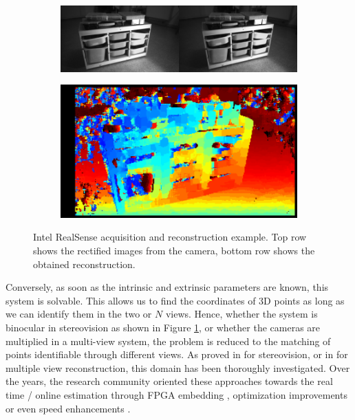 \begin{figure}[h]
	\centering
	\begin{subfigure}{.8\textwidth}
		\centering
		\includegraphics[width=\linewidth]{Figures/SOA/rectified-768x216}
	\end{subfigure}
	\begin{subfigure}{.8\textwidth}
		
		\centering
		\includegraphics[width=\linewidth]{Figures/SOA/ssd-depth-768x432.png}
	\end{subfigure}
	\caption[Intel RealSense acquisition and reconstruction example.]{Intel RealSense acquisition and reconstruction example. Top row shows the rectified images from the camera, bottom row shows the obtained reconstruction.}
	\label{intel}
\end{figure}

Conversely, as soon as the intrinsic and extrinsic parameters are known, this system is solvable. This allows us to find the coordinates of 3D points as long as we can identify them in the two or $N$ views. Hence, whether the system is binocular in stereovision as shown in Figure \ref{intel}, or whether the cameras are multiplied in a multi-view system, the problem is reduced to the matching of points identifiable through different views.
As proved in \cite{bensrhair1996fast,banks2001quantitative,scharstein2002taxonomy,gehrig2009real} for stereovision, or in \cite{hartley1994projective,hartley2000zisserman,campbell2008using} for multiple view reconstruction, this domain has been thoroughly investigated.
Over the years, the research community oriented these approaches towards the real time / online estimation through FPGA embedding \cite{banz2010real}, optimization improvements \cite{kolmogorov2002multi, michael2013real,rodriguez2017improve} or even speed enhancements \cite{feng2019asv}.

